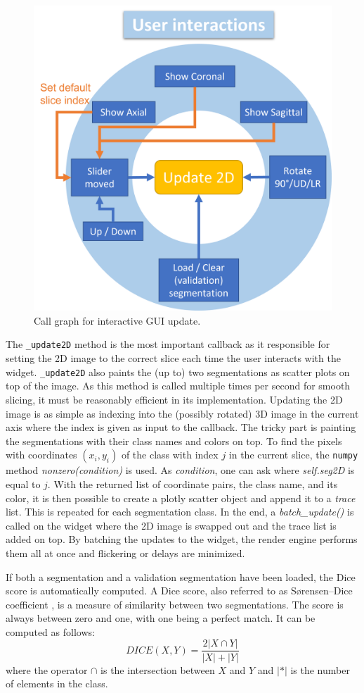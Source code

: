 \begin{figure}[h]
	\centering
	\includegraphics[height=.7\linewidth]{figures/call_graph.png}
	\caption{Call graph for interactive GUI update.}
	\label{fig:callbacks}
\end{figure}

The \texttt{\_update2D} method is the most important callback as it responsible for setting the 2D image to the correct slice each time the user interacts with the widget. \texttt{\_update2D} also paints the (up to) two segmentations as scatter plots on top of the image. As this method is called multiple times per second for smooth slicing, it must be reasonably efficient in its implementation. Updating the 2D image is as simple as indexing into the (possibly rotated) 3D image in the current axis where the index is given as input to the callback. The tricky part is painting the segmentations with their class names and colors on top. To find the pixels with coordinates $(x_i , y_i)$ of the class with index $j$ in the current slice, the \texttt{numpy} method \emph{nonzero(condition)} is used. As \emph{condition}, one can ask where \emph{self.seg2D} is equal to $j$. With the returned list of coordinate pairs, the class name, and its color, it is then possible to create a plotly scatter object and append it to a \emph{trace} list. This is repeated for each segmentation class. In the end, a \emph{batch\_update()} is called on the widget where the 2D image is swapped out and the trace list is added on top. By batching the updates to the widget, the render engine performs them all at once and flickering or delays are minimized. 

If both a segmentation and a validation segmentation have been loaded, the Dice score is automatically computed. A Dice score, also referred to as Sørensen–Dice coefficient \cite{dice}, is a measure of similarity between two segmentations. The score is always between zero and one, with one being a perfect match. It can be computed as follows:
\begin{equation}
	DICE(X, Y) =\frac{2|X \cap Y|}{|X|+|Y|}
	\label{eq:dice}
\end{equation}
where the operator $\cap$ is the intersection between $X$ and $Y$ and $|*|$ is the number of elements in the class. 

